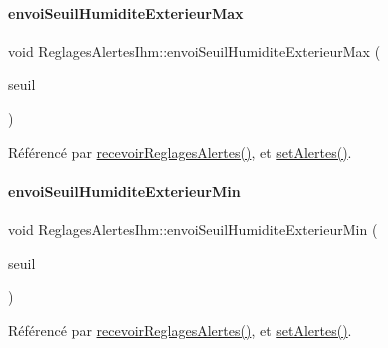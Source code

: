 \paragraph{\texorpdfstring{envoi\+Seuil\+Humidite\+Exterieur\+Max}{envoiSeuilHumiditeExterieurMax}}
{\footnotesize\ttfamily void Reglages\+Alertes\+Ihm\+::envoi\+Seuil\+Humidite\+Exterieur\+Max (\begin{DoxyParamCaption}\item[{Q\+String}]{seuil }\end{DoxyParamCaption})\hspace{0.3cm}{\ttfamily [signal]}}



Référencé par \hyperlink{class_reglages_alertes_ihm_a5c40f718b28b948a90574ef0c2d3e587}{recevoir\+Reglages\+Alertes()}, et \hyperlink{class_reglages_alertes_ihm_aeb0331a6103f944cb15cdd62985ca231}{set\+Alertes()}.

\mbox{\label{class_reglages_alertes_ihm_a78cef50cbaaaa46c837230024129c092}} 
\paragraph{\texorpdfstring{envoi\+Seuil\+Humidite\+Exterieur\+Min}{envoiSeuilHumiditeExterieurMin}}
{\footnotesize\ttfamily void Reglages\+Alertes\+Ihm\+::envoi\+Seuil\+Humidite\+Exterieur\+Min (\begin{DoxyParamCaption}\item[{Q\+String}]{seuil }\end{DoxyParamCaption})\hspace{0.3cm}{\ttfamily [signal]}}



Référencé par \hyperlink{class_reglages_alertes_ihm_a5c40f718b28b948a90574ef0c2d3e587}{recevoir\+Reglages\+Alertes()}, et \hyperlink{class_reglages_alertes_ihm_aeb0331a6103f944cb15cdd62985ca231}{set\+Alertes()}.

\mbox{\label{class_reglages_alertes_ihm_ae5e409ea2353cc8e43f312e252b365f9}} 
